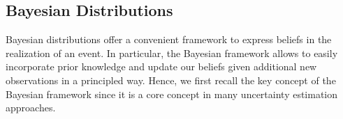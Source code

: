 
\subsection{Bayesian Distributions} 

Bayesian distributions offer a convenient framework to express beliefs in the realization of an event. In particular, the Bayesian framework allows to easily incorporate prior knowledge and update our beliefs given additional new observations in a principled way. Hence, we first recall the key concept of the Bayesian framework since it is a core concept in many uncertainty estimation approaches.

